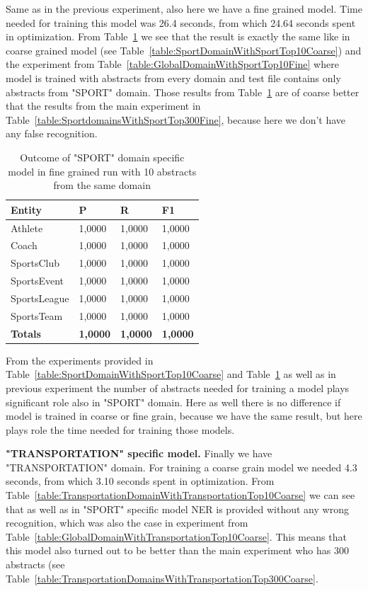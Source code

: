 \documentclass[thesis=M,english]{FITthesis}[2018/05/30]
\begin{document}
	Same as in the previous experiment, also here we have a fine grained model. Time needed for training this model was 26.4 seconds, from which 24.64 seconds spent in optimization. From Table~\ref{table:SportDomainWithSportTop10Fine} we see that the result is exactly the same like in coarse grained model (see Table~\ref{table:SportDomainWithSportTop10Coarse}) and the experiment from Table~\ref{table:GlobalDomainWithSportTop10Fine} where model is trained with abstracts from every domain and test file contains only abstracts from "SPORT" domain. Those results from Table~\ref{table:SportDomainWithSportTop10Fine} are of coarse better that the results from the main experiment in Table~\ref{table:SportdomainsWithSportTop300Fine}, because here we don't have any false recognition.
	 
	\begin{table}[H]\centering
		\begin{tabular}{|l|l|l|l|}
			\hline {\textbf{Entity}} & {\textbf{P}} & {\textbf{R}} & {\textbf{F1}}\\\hline
				Athlete & 1,0000 & 1,0000 & 1,0000\\
				Coach & 1,0000 & 1,0000 & 1,0000\\
				SportsClub & 1,0000 & 1,0000 & 1,0000\\
				SportsEvent & 1,0000 & 1,0000 & 1,0000\\
				SportsLeague & 1,0000 & 1,0000 & 1,0000\\
				SportsTeam & 1,0000 & 1,0000 & 1,0000\\\hline
				\textbf{Totals} & \textbf{1,0000} & \textbf{1,0000} & \textbf{1,0000}\\\hline
		\end{tabular}
		\caption{Outcome of "SPORT" domain specific model in fine grained run with 10 abstracts from the same domain \label{table:SportDomainWithSportTop10Fine}}
	\end{table}	

	From the experiments provided in Table~\ref{table:SportDomainWithSportTop10Coarse} and Table~\ref{table:SportDomainWithSportTop10Fine} as well as in previous experiment the number of abstracts needed for training a model plays significant role also in "SPORT" domain. Here as well there is no difference if model is trained in coarse or fine grain, because we have the same result, but here plays role the time needed for training those models.
	
	\textbf{"TRANSPORTATION" specific model.} Finally we have "TRANSPORTATION" domain. For training a coarse grain model we needed 4.3 seconds, from which 3.10 seconds spent in optimization. From Table~\ref{table:TransportationDomainWithTransportationTop10Coarse} we can see that as well as in "SPORT" specific model NER is provided without any wrong recognition, which was also the case in experiment from Table~\ref{table:GlobalDomainWithTransportationTop10Coarse}. This means that this model also turned out to be better than the main experiment who has 300 abstracts (see Table~\ref{table:TransportationDomainsWithTransportationTop300Coarse}.
	
\end{document}
